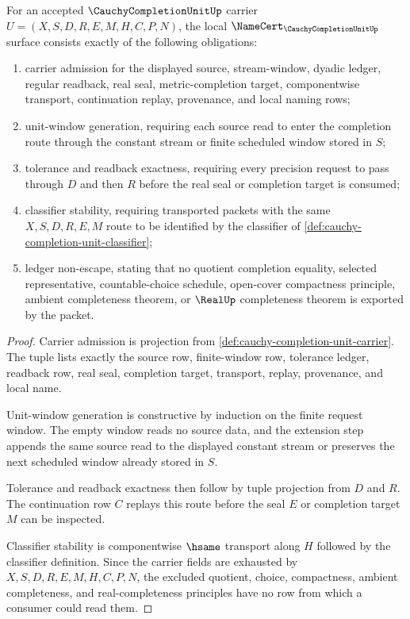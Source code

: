 \begin{theorem}
\label{thm:cauchy-completion-unit-namecert-obligations}
For an accepted $\CauchyCompletionUnitUp$ carrier $U=(X,S,D,R,E,M,H,C,P,N)$, the local $\NameCert_{\CauchyCompletionUnitUp}$ surface consists exactly of the following obligations:
\begin{enumerate}
\item carrier admission for the displayed source, stream-window, dyadic ledger, regular readback, real seal, metric-completion target, componentwise transport, continuation replay, provenance, and local naming rows;
\item unit-window generation, requiring each source read to enter the completion route through the constant stream or finite scheduled window stored in $S$;
\item tolerance and readback exactness, requiring every precision request to pass through $D$ and then $R$ before the real seal or completion target is consumed;
\item classifier stability, requiring transported packets with the same $X,S,D,R,E,M$ route to be identified by the classifier of \autoref{def:cauchy-completion-unit-classifier};
\item ledger non-escape, stating that no quotient completion equality, selected representative, countable-choice schedule, open-cover compactness principle, ambient completeness theorem, or $\RealUp$ completeness theorem is exported by the packet.
\end{enumerate}
\end{theorem}
\begin{proof}
Carrier admission is projection from \autoref{def:cauchy-completion-unit-carrier}. The tuple lists exactly the source row, finite-window row, tolerance ledger, readback row, real seal, completion target, transport, replay, provenance, and local name.

Unit-window generation is constructive by induction on the finite request window. The empty window reads no source data, and the extension step appends the same source read to the displayed constant stream or preserves the next scheduled window already stored in $S$.

Tolerance and readback exactness then follow by tuple projection from $D$ and $R$. The continuation row $C$ replays this route before the seal $E$ or completion target $M$ can be inspected.

Classifier stability is componentwise $\hsame$ transport along $H$ followed by the classifier definition. Since the carrier fields are exhausted by $X,S,D,R,E,M,H,C,P,N$, the excluded quotient, choice, compactness, ambient completeness, and real-completeness principles have no row from which a consumer could read them.
\end{proof}

